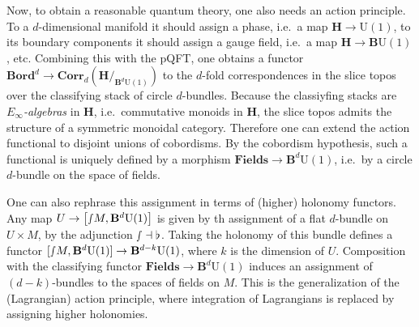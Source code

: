     Now, to obtain a reasonable quantum theory, one also needs an action principle. To a $d$-dimensional manifold it should assign a phase, i.e.~a map $\mathbf{H}\rightarrow\mathrm{U}(1)$, to its boundary components it should assign a gauge field, i.e.~a map $\mathbf{H}\rightarrow\mathbf{B}\mathrm{U}(1)$, etc. Combining this with the pQFT, one obtains a functor $\mathbf{Bord}^d\rightarrow\mathbf{Corr}_d(\mathbf{H}/_{\mathbf{B}^d\mathrm{U}(1)})$ to the $d$-fold correspondences in the slice topos over the classifying stack of circle $d$-bundles. Because the classiyfing stacks are \textit{$E_\infty$-algebras} in $\mathbf{H}$, i.e.~commutative monoids in $\mathbf{H}$, the slice topos admits the structure of a symmetric monoidal category. Therefore one can extend the action functional to disjoint unions of cobordisms.
    By the cobordism hypothesis, such a functional is uniquely defined by a morphism $\mathbf{Fields}\rightarrow\mathbf{B}^d\mathrm{U}(1)$, i.e.~by a circle $d$-bundle on the space of fields.

    One can also rephrase this assignment in terms of (higher) holonomy functors. Any map $U\rightarrow\bigl[\smallint\!M,\mathbf{B}^d\mathrm{U}(1)\bigr]$ is given by th assignment of a flat $d$-bundle on $U\times M$, by the adjunction $\smallint\dashv\flat$. Taking the holonomy of this bundle defines a functor $[\smallint\!M,\mathbf{B}^d\mathrm{U}(1)]\rightarrow\mathbf{B}^{d-k}\mathrm{U}(1)$, where $k$ is the dimension of $U$. Composition with the classifying functor $\mathbf{Fields}\rightarrow\mathbf{B}^d\mathrm{U}(1)$ induces an assignment of $(d-k)$-bundles to the spaces of fields on $M$. This is the generalization of the (Lagrangian) action principle, where integration of Lagrangians is replaced by assigning higher holonomies.